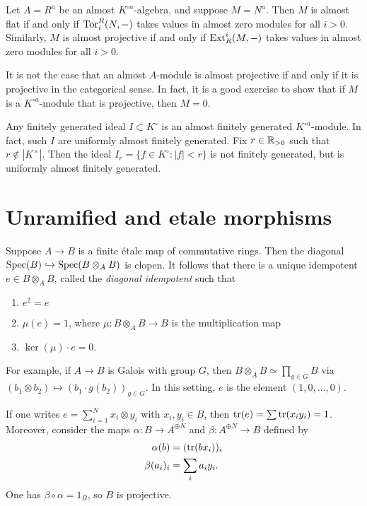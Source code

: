 \documentclass{article}
\begin{document}
Let $A=R^a$ be an almost $K^{\circ a}$-algebra, and suppose $M=N^a$. Then $M$ is 
almost flat if and only if $\operatorname{Tor}_i^R(N,-)$ takes values in almost zero 
modules for all $i>0$. Similarly, $M$ is almost projective if and only if 
$\operatorname{Ext}_R^i(M,-)$ takes values in almost zero modules for all $i>0$. 

It is not the case that an almost $A$-module is almost projective if and only 
if it is projective in the categorical sense. In fact, it is a good exercise to 
show that if $M$ is a $K^{\circ a}$-module that is projective, then $M=0$. 

Any finitely generated ideal $I\subset K^\circ$ is an almost finitely generated 
$K^{\circ a}$-module. In fact, such $I$ are uniformly almost finitely generated. 
Fix $r\in \mathbb{R}_{>0}$ such that $r\notin |K^\times|$. Then the ideal 
$I_r=\{f\in K^\circ:|f|<r\}$ is not finitely generated, but is uniformly almost 
finitely generated. 






\section{Unramified and etale morphisms}

Suppose $A\to B$ is a finite \'etale map of commutative rings. Then the 
diagonal $\operatorname{Spec}(B)\hookrightarrow \operatorname{Spec}(B\otimes_A B)$ is clopen. It follows 
that there is a unique idempotent $e\in B\otimes_A B$, called the \emph{diagonal 
idempotent} such that 
\begin{enumerate}
  \item $e^2=e$ 
  \item $\mu(e)=1$, where $\mu:B\otimes_A B\to B$ is the multiplication map 
  \item $\ker(\mu)\cdot e = 0$. 
\end{enumerate}

For example, if $A\to B$ is Galois with group $G$, then 
$B\otimes_A B\simeq \prod_{g\in G} B$ via 
$(b_1\otimes b_2)\mapsto (b_1\cdot g(b_2))_{g\in G}$. In this setting, $e$ is the 
element $(1,0,\dots,0)$. 

If one writes $e=\sum_{i=1}^N x_i\otimes y_i$ with $x_i,y_i\in B$, then 
$\operatorname{tr}(e) = \sum \operatorname{tr}(x_i y_i) = 1$. Moreover, consider the maps 
$\alpha:B\to A^{\oplus N}$ and $\beta:A^{\oplus N} \to B$ defined by 
\begin{align*}
  \alpha(b) &= (\operatorname{tr}(b x_i))_i \\
  \beta(a_i)_i &= \sum_i a_i y_i .
\end{align*}
One has $\beta\circ\alpha = 1_B$, so $B$ is projective. 
\end{document}
